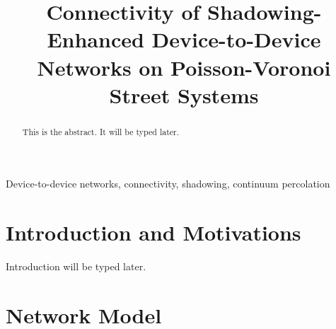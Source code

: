 \documentclass[conference]{IEEEtran}
\begin{document}
\title{Connectivity of Shadowing-Enhanced Device-to-Device Networks on Poisson-Voronoi Street Systems
}

\author{
}

\maketitle

\begin{abstract}
This is the abstract. It will be typed later.
\end{abstract}

\begin{IEEEkeywords}
Device-to-device networks, connectivity, shadowing, continuum percolation
\end{IEEEkeywords}

\section{Introduction and Motivations}
Introduction will be typed later. 

\section{Network Model}
\end{document}
